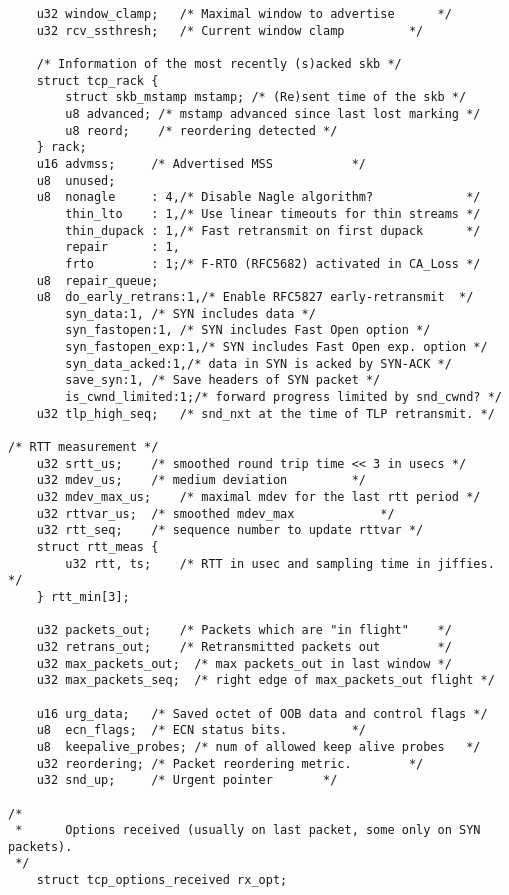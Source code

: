 \begin{verbatim}
    u32 window_clamp;   /* Maximal window to advertise      */
    u32 rcv_ssthresh;   /* Current window clamp         */

    /* Information of the most recently (s)acked skb */
    struct tcp_rack {
        struct skb_mstamp mstamp; /* (Re)sent time of the skb */
        u8 advanced; /* mstamp advanced since last lost marking */
        u8 reord;    /* reordering detected */
    } rack;
    u16 advmss;     /* Advertised MSS           */
    u8  unused;
    u8  nonagle     : 4,/* Disable Nagle algorithm?             */
        thin_lto    : 1,/* Use linear timeouts for thin streams */
        thin_dupack : 1,/* Fast retransmit on first dupack      */
        repair      : 1,
        frto        : 1;/* F-RTO (RFC5682) activated in CA_Loss */
    u8  repair_queue;
    u8  do_early_retrans:1,/* Enable RFC5827 early-retransmit  */
        syn_data:1, /* SYN includes data */
        syn_fastopen:1, /* SYN includes Fast Open option */
        syn_fastopen_exp:1,/* SYN includes Fast Open exp. option */
        syn_data_acked:1,/* data in SYN is acked by SYN-ACK */
        save_syn:1, /* Save headers of SYN packet */
        is_cwnd_limited:1;/* forward progress limited by snd_cwnd? */
    u32 tlp_high_seq;   /* snd_nxt at the time of TLP retransmit. */

/* RTT measurement */
    u32 srtt_us;    /* smoothed round trip time << 3 in usecs */
    u32 mdev_us;    /* medium deviation         */
    u32 mdev_max_us;    /* maximal mdev for the last rtt period */
    u32 rttvar_us;  /* smoothed mdev_max            */
    u32 rtt_seq;    /* sequence number to update rttvar */
    struct rtt_meas {
        u32 rtt, ts;    /* RTT in usec and sampling time in jiffies. */
    } rtt_min[3];

    u32 packets_out;    /* Packets which are "in flight"    */
    u32 retrans_out;    /* Retransmitted packets out        */
    u32 max_packets_out;  /* max packets_out in last window */
    u32 max_packets_seq;  /* right edge of max_packets_out flight */

    u16 urg_data;   /* Saved octet of OOB data and control flags */
    u8  ecn_flags;  /* ECN status bits.         */
    u8  keepalive_probes; /* num of allowed keep alive probes   */
    u32 reordering; /* Packet reordering metric.        */
    u32 snd_up;     /* Urgent pointer       */

/*
 *      Options received (usually on last packet, some only on SYN packets).
 */
    struct tcp_options_received rx_opt;


\end{verbatim}
